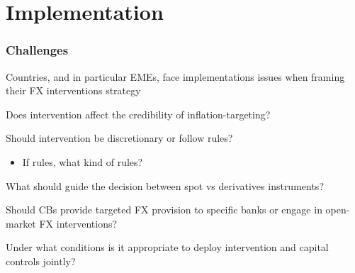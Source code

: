 \documentclass{beamer}
\newenvironment{wideitemize}{\itemize\addtolength{\itemsep}{10pt}}{\enditemize}
\begin{document}
\section{Implementation}

\begin{frame}
  \frametitle{Challenges}

  Countries, and in particular EMEs, face implementations issues when framing their FX interventions strategy
  \begin{wideitemize}
    \item Does intervention affect the credibility of inflation-targeting?
    \item Should intervention be discretionary or follow rules?
      \begin{itemize}
      \item If rules, what kind of rules?
      \end{itemize}
  \item What should guide the decision between spot vs derivatives instruments?
  \item Should CBs provide targeted FX provision to specific banks or engage in open-market FX interventions?
  \item Under what conditions is it appropriate to deploy intervention and capital controls jointly?
  \end{wideitemize}
\end{frame}
\end{document}

